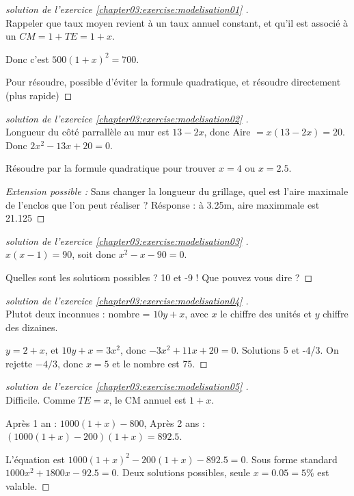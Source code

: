 \documentclass[main.tex]{subfiles}
\begin{document}
\newpage
\begin{proof}[solution de l'exercice \ref{chapter03:exercise:modelisation01} ]\hfill \\
	Rappeler que taux moyen revient à un taux annuel constant, et qu'il est associé à un $CM=1+TE=1+x$.
	
	Donc c'est $500(1+x)^2=700$.
	
	Pour résoudre, possible d'éviter la formule quadratique, et résoudre directement (plus rapide)
\end{proof}
\begin{proof}[solution de l'exercice \ref{chapter03:exercise:modelisation02} ]\hfill \\
Longueur du côté parrallèle au mur est $13-2x$, donc Aire $= x(13-2x)=20$. Donc $2x^2-13x+20=0$. 

Résoudre par la formule quadratique pour trouver $x=4$ ou $x=2.5$.

\emph{Extension possible : } Sans changer la longueur du grillage, quel est l'aire maximale de l'enclos que l'on peut réaliser ? Résponse : à 3.25m, aire maximmale est 21.125 
\end{proof}
\begin{proof}[solution de l'exercice \ref{chapter03:exercise:modelisation03} ]\hfill \\
$x(x-1)=90$, soit donc $x^2-x-90=0$. 

Quelles sont les solutiosn possibles ? 10 et -9 ! Que pouvez vous dire ?
\end{proof}
\begin{proof}[solution de l'exercice \ref{chapter03:exercise:modelisation04} ]\hfill \\
Plutot deux inconnues : nombre = $10y+x$, avec $x$ le chiffre des unités et $y$ chiffre des dizaines.

$y=2+x$, et $10y+x=3x^2$, donc $-3x^2+11x+20=0$. Solutions 5 et -4/3. On rejette $-4/3$, donc $x=5$ et le nombre est $75$.  
\end{proof}
\begin{proof}[solution de l'exercice \ref{chapter03:exercise:modelisation05} ]\hfill \\
Difficile. Comme $TE=x$, le CM annuel est $1+x$.

Après 1 an : $1000(1+x)-800$, Après 2 ans : $(1000(1+x)-200)(1+x)=892.5$. 

L'équation est $1000(1+x)^2-200(1+x)-892.5=0$. Sous forme standard $1000x^2+1800x-92.5=0$. Deux solutions possibles, seule $x=0.05=5\%$ est valable.
\end{proof}
\end{document}
